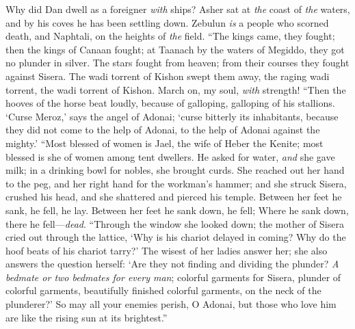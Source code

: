 \begin{biblechapter}
Why did Dan dwell as a foreigner \textit{with} ships? 
Asher sat at \textit{the} coast of \textit{the} waters, 
and by his coves he has been settling down.
\verse Zebulun \textit{is} a people who scorned death, 
and Naphtali, on the heights of \textit{the} field.
\verse “The kings came, they fought; 
then the kings of Canaan fought; 
at Taanach by the waters of Megiddo, 
they got no plunder in silver.
\verse The stars fought from heaven; 
from their courses they fought against Sisera.
\verse The wadi torrent of Kishon swept them away, 
the raging wadi torrent, 
the wadi torrent of Kishon. 
March on, my soul, \textit{with} strength!
\verse “Then the hooves of the horse beat loudly, 
because of galloping, galloping of his stallions.
\verse ‘Curse Meroz,’ says the angel of Adonai; 
‘curse bitterly its inhabitants, 
because they did not come to the help of Adonai, 
to the help of Adonai against the mighty.’
\verse “Most blessed of women is Jael, 
the wife of Heber the Kenite; 
most blessed is she of women among tent dwellers.
\verse He asked for water, \textit{and} she gave milk; 
in a drinking bowl for nobles, she brought curds.
\verse She reached out her hand to the peg, 
and her right hand for the workman’s hammer; 
and she struck Sisera, crushed his head, 
and she shattered and pierced his temple.
\verse Between her feet he sank, he fell, he lay. 
Between her feet he sank down, he fell; 
Where he sank down, there he fell—\textit{dead}.
\verse “Through the window she looked down; 
the mother of Sisera cried out through the lattice, 
‘Why is his chariot delayed in coming? 
Why do the hoof beats of his chariot tarry?’
\verse The wisest of her ladies answer her; 
she also answers the question herself:
\verse ‘Are they not finding and dividing the plunder? 
\textit{A bedmate or two bedmates for every man}; 
colorful garments for Sisera, 
plunder of colorful garments, 
beautifully finished colorful garments, 
on the neck of the plunderer?’
\verse So may all your enemies perish, O Adonai, 
but those who love him are like the rising sun at its brightest.”
\end{biblechapter}

